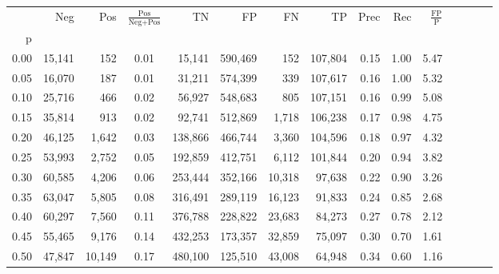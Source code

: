 \begin{tabular}{rrrcrrrrrrrrrrr}
\toprule
{} &     Neg &     Pos & $\frac{\text{Pos}}{\text{Neg}+\text{Pos}}$ &       TN &       FP &       FN &       TP &  Prec &   Rec & $\frac{\text{FP}}{\text{P}}$ \\
p    &         &         &                                            &          &          &          &          &       &       &                              \\
\midrule
0.00 &  15,141 &     152 &                                       0.01 &   15,141 &  590,469 &      152 &  107,804 &  0.15 &  1.00 &                         5.47 \\
0.05 &  16,070 &     187 &                                       0.01 &   31,211 &  574,399 &      339 &  107,617 &  0.16 &  1.00 &                         5.32 \\
0.10 &  25,716 &     466 &                                       0.02 &   56,927 &  548,683 &      805 &  107,151 &  0.16 &  0.99 &                         5.08 \\
0.15 &  35,814 &     913 &                                       0.02 &   92,741 &  512,869 &    1,718 &  106,238 &  0.17 &  0.98 &                         4.75 \\
0.20 &  46,125 &   1,642 &                                       0.03 &  138,866 &  466,744 &    3,360 &  104,596 &  0.18 &  0.97 &                         4.32 \\
0.25 &  53,993 &   2,752 &                                       0.05 &  192,859 &  412,751 &    6,112 &  101,844 &  0.20 &  0.94 &                         3.82 \\
0.30 &  60,585 &   4,206 &                                       0.06 &  253,444 &  352,166 &   10,318 &   97,638 &  0.22 &  0.90 &                         3.26 \\
0.35 &  63,047 &   5,805 &                                       0.08 &  316,491 &  289,119 &   16,123 &   91,833 &  0.24 &  0.85 &                         2.68 \\
0.40 &  60,297 &   7,560 &                                       0.11 &  376,788 &  228,822 &   23,683 &   84,273 &  0.27 &  0.78 &                         2.12 \\
0.45 &  55,465 &   9,176 &                                       0.14 &  432,253 &  173,357 &   32,859 &   75,097 &  0.30 &  0.70 &                         1.61 \\
0.50 &  47,847 &  10,149 &                                       0.17 &  480,100 &  125,510 &   43,008 &   64,948 &  0.34 &  0.60 &                         1.16 \\

\end{tabular}
